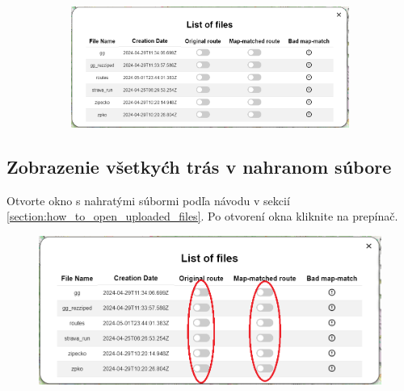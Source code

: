 \begin{figure}[H]
\begin{subfigure}{0.2\textwidth}
    \end{subfigure}
    \begin{subfigure}{0.78\textwidth}
        \centering
        \includegraphics[width=1\textwidth]{guide_includes/img/uploaded_files_window.png}
    \end{subfigure}
\end{figure}

\subsection{Zobrazenie všetkyćh trás v nahranom súbore}
Otvorte okno s nahratými súbormi podľa návodu v sekcií \ref{section:how_to_open_uploaded_files}. Po otvorení okna kliknite na prepínač. 
\begin{figure}[H]
    \centering
    \includegraphics[width=1\textwidth]{guide_includes/img/toggle_all_routes.png}
\end{figure}

\pagebreak
